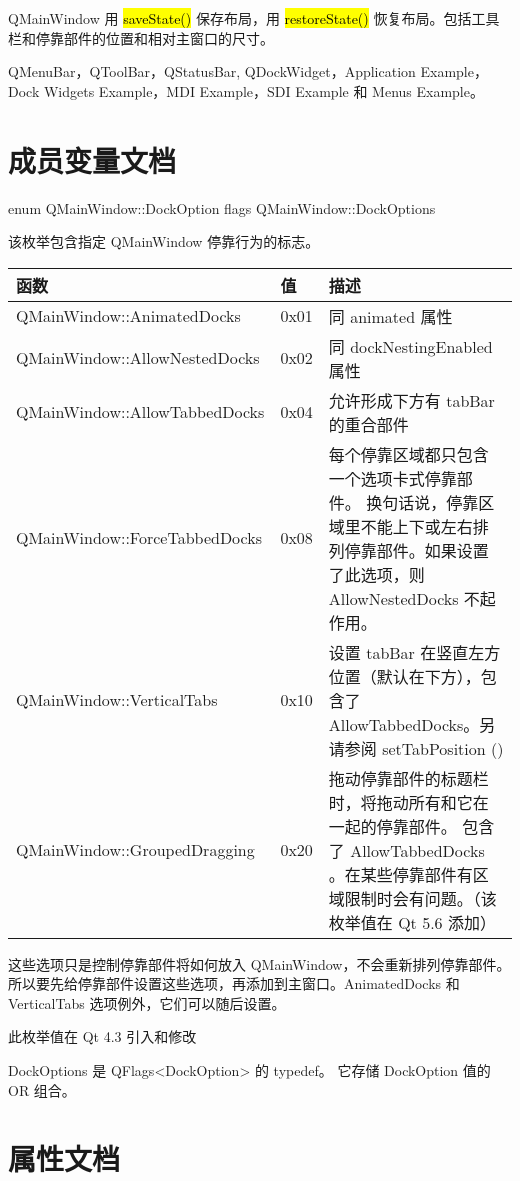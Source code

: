 QMainWindow 用 \hl{saveState()} 保存布局，用 \hl{restoreState()} 恢复布局。包括工具栏和停靠部件的位置和相对主窗口的尺寸。

\begin{seeAlso}
QMenuBar，QToolBar，QStatusBar, QDockWidget，Application Example，
Dock Widgets Example，MDI Example，SDI Example 和 Menus Example。
\end{seeAlso}

\section{成员变量文档}

enum QMainWindow::DockOption flags QMainWindow::DockOptions

该枚举包含指定 QMainWindow 停靠行为的标志。

\begin{tabular}{|l|l|m{25em}|}
\hline
函数	& 值	&描述 \\ 
\hline
QMainWindow::AnimatedDocks&	0x01	&同 animated 属性 \\
\hline
QMainWindow::AllowNestedDocks	&0x02&	同 dockNestingEnabled 属性 \\ 
\hline
QMainWindow::AllowTabbedDocks	&0x04	&允许形成下方有 tabBar 的重合部件 \\ 
\hline
QMainWindow::ForceTabbedDocks	&0x08&	每个停靠区域都只包含一个选项卡式停靠部件。
换句话说，停靠区域里不能上下或左右排列停靠部件。如果设置了此选项，则 AllowNestedDocks 不起作用。 \\
\hline
QMainWindow::VerticalTabs	&0x10	&设置 tabBar 在竖直左方位置（默认在下方），包含了 AllowTabbedDocks。另请参阅 setTabPosition () \\ 
\hline
QMainWindow::GroupedDragging	&0x20	&拖动停靠部件的标题栏时，将拖动所有和它在一起的停靠部件。
包含了 AllowTabbedDocks 。在某些停靠部件有区域限制时会有问题。（该枚举值在 Qt 5.6 添加） \\ 
\hline
\end{tabular}

这些选项只是控制停靠部件将如何放入 QMainWindow，不会重新排列停靠部件。
所以要先给停靠部件设置这些选项，再添加到主窗口。AnimatedDocks 和 VerticalTabs 选项例外，它们可以随后设置。

此枚举值在 Qt 4.3 引入和修改

DockOptions 是 QFlags<DockOption> 的 typedef。
它存储 DockOption 值的 OR 组合。

\section{属性文档}


